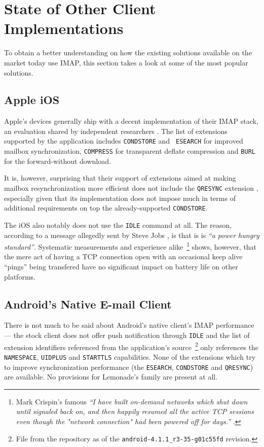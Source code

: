 \documentclass[trojita]{subfiles}
\begin{document}
\section{State of Other Client Implementations}

To obtain a better understanding on how the existing solutions available on the market today use IMAP, this section
takes a look at some of the most popular solutions.

\subsection{Apple iOS}

Apple's devices generally ship with a decent implementation of their IMAP stack, an evaluation shared by independent
researchers \cite{isode-iphone4}.  The list of extensions supported by the application includes {\tt CONDSTORE} and {\tt
ESEARCH} for improved mailbox synchronization, {\tt COMPRESS} for transparent deflate compression and {\tt BURL} for the
forward-without download.

It is, however, surprising that their support of extensions aimed at making mailbox resynchronization more efficient
does not include the {\tt QRESYNC} extension \cite{rfc5162}, especially given that its implementation does not impose
much in terms of additional requirements on top the already-supported {\tt CONDSTORE}.

The iOS also notably does not use the {\tt IDLE} command at all.  The reason, according to a message allegedly sent by
Steve Jobs \cite{jobs-ios-idle}, is that is is {\em ``a power hungry standard''}.  Systematic measurements
\cite{wcdma-energy} \cite{cridland-fach-dch-measurements} and experience alike~\footnote{Mark Crispin's famous {\em ``I
have built on-demand networks which shut down until signaled back on, and then happily resumed all the active TCP
sessions even though the "network connection" had been powered off for days.''} \cite{crispin-no-ifup}.} shows, however,
that the mere act of having a TCP connection open with an occasional keep alive ``pings'' being transfered have no
significant impact on battery life on other platforms.

\subsection{Android's Native E-mail Client}

There is not much to be said about Android's native client's IMAP performance --- the stock client does not offer push
notification through {\tt IDLE} \cite{android-idle} and the list of extension identifiers referenced from the
application's source~\footnote{File  from the
 repository as of the {\tt android-4.1.1\_r3-35-g01c55fd} revision.} only references
the {\tt NAMESPACE}, {\tt UIDPLUS} and {\tt STARTTLS} capabilities.  None of the extensions which try to improve
synchronization performance (the {\tt ESEARCH}, {\tt CONDSTORE} and {\tt QRESYNC}) are available.  No provisions for
Lemonade's family are present at all.
\end{document}
